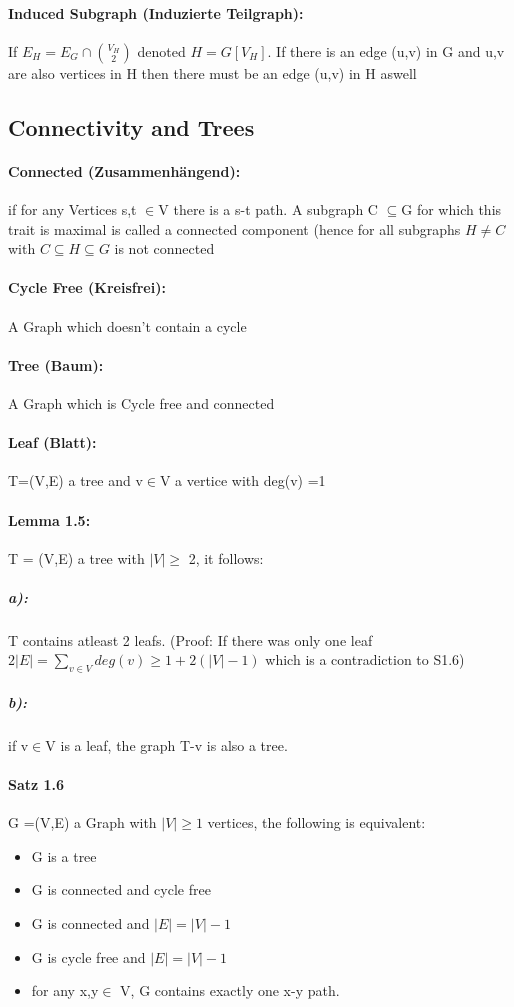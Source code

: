 \documentclass[8pt]{extreport}
\begin{document}
\paragraph{Induced Subgraph (Induzierte Teilgraph):} If $E_{H} = E_{G} \cap \binom{V_{H}}{2}$ denoted $H = G[V_{H}]$. If there is an edge (u,v) in G and u,v are also vertices in H then there must be an edge (u,v) in H aswell
\subsection{Connectivity and Trees}
\paragraph{Connected (Zusammenhängend):} if for any Vertices s,t $\in$V there is a s-t path. A subgraph C $\subseteq$G for which this trait is maximal is called a connected component (hence for all subgraphs $H\neq C$ with $C\subseteq H \subseteq G$ is not connected
\paragraph{Cycle Free (Kreisfrei):} A Graph which doesn't contain a cycle
\paragraph{Tree (Baum):} A Graph which is Cycle free and connected
\paragraph{Leaf (Blatt):} T=(V,E) a tree and v$\in$V a vertice with deg(v) =1
\paragraph{Lemma 1.5:} T = (V,E) a tree with $|V|\geq$ 2, it follows:
\subparagraph{a):} T contains atleast 2 leafs. (Proof: If there was only one leaf \\$2|E| = \sum_{v\in V}deg(v)\geq 1 + 2(|V|-1)$ which is a contradiction to S1.6)
\subparagraph{b):} if v$\in$V is a leaf, the graph T-v is also a tree.
\paragraph{Satz 1.6} G =(V,E) a Graph with $|V|\geq 1$ vertices, the following is equivalent:
\begin{itemize}
\item G is a tree
\item G is connected and cycle free
\item G is connected and $|E| = |V| -1$
\item G is cycle free and $|E| = |V|-1$
\item for any x,y$\in$ V, G contains exactly one x-y path.
\end{itemize}
\end{document}

